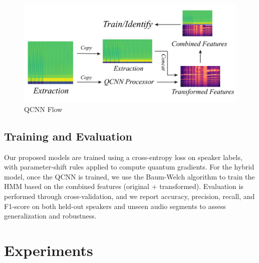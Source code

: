 \documentclass[conference]{IEEEtran}
\begin{document}
\begin{figure}[H]
    \centering
    \begin{minipage}{0.5\textwidth}
        \centering
        \includegraphics[width=1\textwidth]{resource/img/qcnn_flow.pdf}
        \caption{QCNN Flow}
        \label{fig:qcnn_flow}
    \end{minipage}

\end{figure}
\subsection{Training and Evaluation}

Our proposed models are trained using a cross-entropy loss on speaker labels, with parameter-shift rules applied to compute quantum gradients. For the hybrid model, once the QCNN is trained, we use the Baum-Welch algorithm to train the HMM based on the combined features (original + transformed). Evaluation is performed through cross-validation, and we report accuracy, precision, recall, and F1-score on both held-out speakers and unseen audio segments to assess generalization and robustness.


\section{Experiments}
\end{document}
